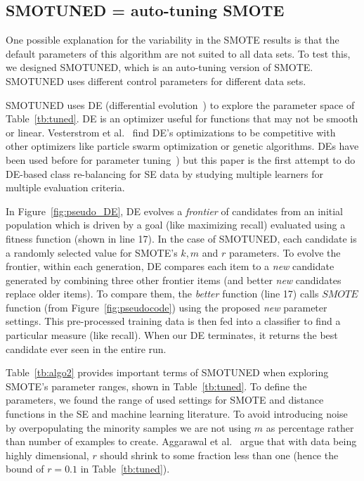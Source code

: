 \documentclass[sigconf]{acmart}
\theoremstyle{break}
\newcommand{\sma}{{\sc SMOTE}}
\newcommand{\smb}{{\sc SMOTUNED}}
\begin{document}
\vspace{-0.2cm}
\subsection{SMOTUNED = auto-tuning {\sma}}
\label{sect:smotuned}

One possible explanation for the variability in the {\sma} results is that the
default parameters of this algorithm are not suited to all data sets. To test this,
we designed {\smb}, which is an auto-tuning version of {\sma}. {\smb}
uses different control parameters for different data sets.


 
{\smb} uses DE (differential evolution~\cite{storn1997differential}) to explore the parameter space of
Table~\ref{tb:tuned}.  DE is an
optimizer useful for functions that may not be smooth or linear.  Vesterstrom et al.~\cite{vesterstrom2004comparative} find   DE's optimizations to be  competitive with other optimizers like 
   particle swarm optimization or genetic algorithms.
   DEs have been used before for   parameter tuning~\cite{omran2005differential, chiha2012tuning,fu2016tuning,fu2017easy, agrawal2016wrong}) but this paper is the first attempt to do
   DE-based class re-balancing for SE data by studying multiple learners for multiple evaluation criteria.

In Figure~\ref{fig:pseudo_DE}, DE evolves a \textit{frontier} of
candidates from an initial population which is driven by a goal (like maximizing recall) evaluated using a fitness function (shown in line 17). In the case of {\smb},
each  candidate is a randomly selected value for {\sma}'s $k, m$ and $r$ parameters.
 To evolve the frontier, within each generation,
 DE compares each item to a {\em new} candidate generated
 by combining three other frontier items (and better {\em new} candidates replace
 older items). 
 To compare them, the {\em better} function (line 17) calls $SMOTE$ function (from Figure~\ref{fig:pseudocode}) using the proposed {\em new} parameter settings. This pre-processed training data is then fed into a classifier to find a particular measure (like recall).
 When our DE  terminates, it returns the best candidate ever seen in the entire run.
 
Table~\ref{tb:algo2} provides important terms of {\smb} when exploring SMOTE's
  parameter ranges,  shown  in  Table~\ref{tb:tuned}. To define
the parameters, we found the range of used settings for {\sma} and distance functions
in the   SE and machine learning  literature. To avoid introducing noise by overpopulating the minority samples we are not using $m$ as percentage rather than number of examples to create. Aggarawal et al.~\cite{aggarwal2001surprising}
argue that with data being highly dimensional, $r$ should shrink to some fraction less than one
(hence the bound of $r=0.1$ in Table~\ref{tb:tuned}). 
\end{document}
